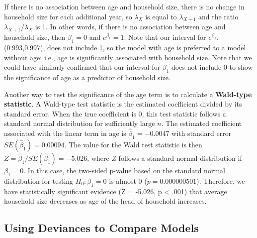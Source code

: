 \documentclass[
]{krantz}
\begin{document}
If there is no association between age and household size, there is no change in household size for each additional year, so \(\lambda_X\) is equal to \(\lambda_{X+1}\) and the ratio \(\lambda_{X+1}/\lambda_X\) is 1. In other words, if there is no association between age and household size, then \(\beta_1=0\) and \(e^{\beta_1}=1\). Note that our interval for \(e^{\beta_1}\), (0.993,0.997), does not include 1, so the model with age is preferred to a model without age; i.e., age is significantly associated with household size. Note that we could have similarly confirmed that our interval for \(\beta_1\) does not include 0 to show the significance of age as a predictor of household size.

Another way to test the significance of the age term is to calculate a \textbf{Wald-type statistic}.  A Wald-type test statistic is the estimated coefficient divided by its standard error. When the true coefficient is 0, this test statistic follows a standard normal distribution for sufficiently large \(n\). The estimated coefficient associated with the linear term in age is \({\hat{\beta}_1}=-0.0047\) with standard error \(SE(\hat{\beta}_1)=0.00094\). The value for the Wald test statistic is then \(Z=\hat{\beta}_1/SE(\hat{\beta}_1)=-5.026\), where \(Z\) follows a standard normal distribution if \(\beta_1=0\). In this case, the two-sided p-value based on the standard normal distribution for testing \(H_0:\beta_1=0\) is almost 0 (\(p=0.000000501\)). Therefore, we have statistically significant evidence (Z = -5.026, p \textless{} .001) that average household size decreases as age of the head of household increases.

\subsection{Using Deviances to Compare Models}\label{sec-Devtocompare}
\end{document}
